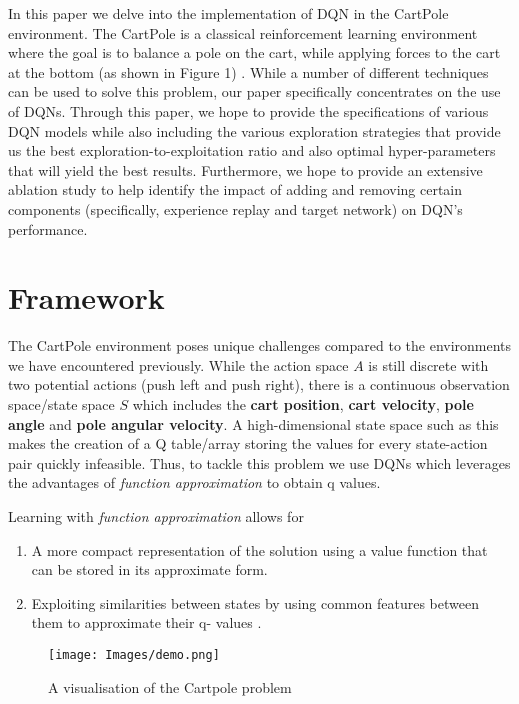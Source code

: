 \documentclass{article}
\begin{document}
In this paper we delve into the implementation of DQN in the CartPole environment. The CartPole is a classical reinforcement learning environment where the goal is to balance a pole on the cart, while  applying forces to the cart at the bottom (as shown in Figure 1) \citep{brockman2016openai}. While a number of different techniques can be used to solve this problem, our paper specifically concentrates on the use of DQNs. Through this paper, we hope to provide the specifications of various DQN models while also including the various exploration strategies that provide us the best exploration-to-exploitation ratio and also optimal hyper-parameters that will yield the best results. Furthermore, we hope to provide an extensive ablation study to help identify the impact of adding and removing certain components (specifically, experience replay and target network) on DQN's performance. \newline

\section{Framework}
\label{Introduction and General Strategy}

The CartPole environment poses unique challenges compared to the environments we have encountered previously. While the action space $A$ is still discrete with two potential actions (push left and push right), there is a continuous observation space/state space $S$ which includes the \textbf{cart position}, \textbf{cart velocity}, \textbf{pole angle} and \textbf{pole angular velocity}. A high-dimensional state space such as this makes the creation of a Q table/array storing the values for every state-action pair quickly infeasible. Thus, to tackle this problem we use DQNs which leverages the advantages of \emph{function approximation} to obtain q values. 
\newline

Learning with \emph{function approximation} allows for 
\begin{enumerate}[itemsep=0pt, parsep=0pt]
\item A more compact representation of the solution using a value function that can be stored in its approximate form.
\item Exploiting similarities between states by using common features between them to approximate their q- values \citep{plaat2018_1}.  
\end{enumerate}

\begin{figure}[htbp]
\centering
\texttt{[image: Images/demo.png]}
\caption{\label{fig:Visualization of the Cart-pole} A visualisation of the Cartpole problem}
\end{figure}
\end{document}
